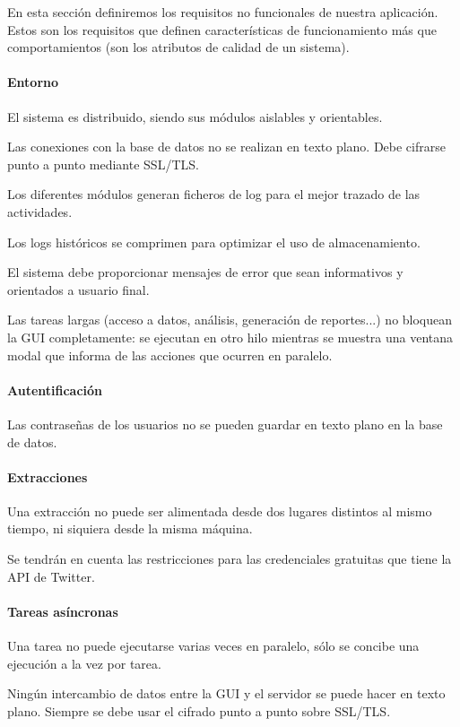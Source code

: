 	En esta sección definiremos los requisitos no funcionales de nuestra aplicación. Estos son los requisitos que definen características de funcionamiento más que comportamientos (son los atributos de calidad de un sistema).
	
\begin{nonfunctional}
	
\paragraph{Entorno}
\item El sistema es distribuido, siendo sus módulos aislables y orientables.
\item Las conexiones con la base de datos no se realizan en texto plano. Debe cifrarse punto a punto mediante SSL/TLS.
\item Los diferentes módulos generan ficheros de log para el mejor trazado de las actividades.
\item Los logs históricos se comprimen para optimizar el uso de almacenamiento. 
\item El sistema debe proporcionar mensajes de error que sean informativos y orientados a usuario final.
\item Las tareas largas (acceso a datos, análisis, generación de reportes...) no bloquean la GUI completamente: se ejecutan en otro hilo mientras se muestra una ventana modal que informa de las acciones que ocurren en paralelo.
\paragraph{Autentificación}
 \item Las contraseñas de los usuarios no se pueden guardar en texto plano en la base de datos.
 \paragraph{Extracciones}
 \item Una extracción no puede ser alimentada desde dos lugares distintos al mismo tiempo, ni siquiera desde la misma máquina.
 \item Se tendrán en cuenta las restricciones para las credenciales gratuitas que tiene la API de Twitter. 
 \paragraph{Tareas asíncronas}
 \item Una tarea no puede ejecutarse varias veces en paralelo, sólo se concibe una ejecución a la vez por tarea.
 \item Ningún intercambio de datos entre la GUI y el servidor se puede hacer en texto plano. Siempre se debe usar el cifrado punto a punto sobre SSL/TLS.
\end{nonfunctional}
